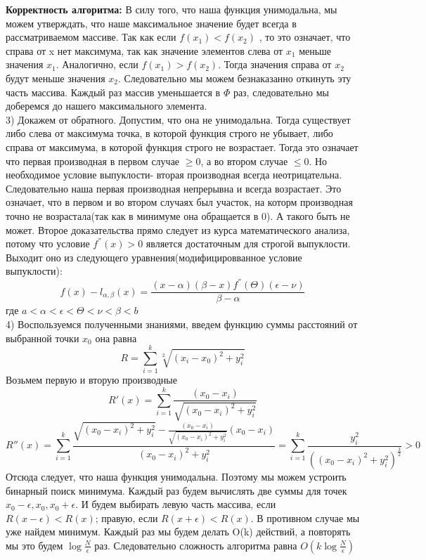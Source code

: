 \documentclass[a4paper,12pt]{article}
\begin{document}
\textbf{Корректность алгоритма:} В силу того, что наша функция унимодальна, мы можем утверждать, что наше максимальное значение будет всегда в рассматриваемом массиве. Так как если $f(x_1)<f(x_2)$ , то это означает, что справа от x нет максимума, так как значение элементов слева от $x_1$ меньше значения $x_1$. Аналогично, если $f(x_1)>f(x_2)$. Тогда значения справа от $x_2$ будут меньше значения $x_2$. Следовательно мы можем безнаказанно откинуть эту часть массива. Каждый раз массив уменьшается в $\Phi$ раз, следовательно мы доберемся до нашего максимального элемента.\\
3) Докажем от обратного. Допустим, что она не унимодальна. Тогда существует либо слева от максимума точка, в которой функция строго не убывает, либо справа от максимума, в которой функция строго не возрастает. Тогда это означает что первая производная в первом случае $\geq 0$, а во втором случае $\leq 0$. Но необходимое условие выпуклости- вторая производная всегда  неотрицательна. Следовательно наша первая производная непрерывна и всегда возрастает. Это означает, что в первом и во втором случаях был участок, на которм производная точно не возрастала(так как в минимуме она обращается в 0). А такого быть не может. Второе доказательства прямо следует из курса математического анализа, потому что условие $f^{''}(x)>0$ является достаточным для строгой выпуклости. Выходит оно из следующего уравнения(модифицировванное условие выпуклости):
\[f(x)-l_{\alpha,\beta}(x)=\frac{(x-\alpha)(\beta-x)f^{''}(\Theta)(\epsilon-\nu)}{\beta-\alpha}\] где $a<\alpha<\epsilon<\Theta<\nu<\beta<b$\\
4) Воспользуемся полученными знаниями, введем функцию суммы расстояний от выбранной точки $x_0$ она равна
\[R=\sum_{i=1}^k \sqrt[2]{(x_i-x_0)^2+y_i^2}\]
Возьмем первую и вторую производные
\[ R'(x) = \sum_{i=1}^k\frac{(x_0-x_i)}{\sqrt{(x_0-x_i)^2+y_i^2}} \]
\[ R''(x) = \sum_{i=1}^k\frac{\sqrt{(x_0-x_i)^2+y_i^2} - \frac{(x_0-x_i)}{\sqrt{(x_0-x_i)^2+y_i^2}}(x_0-x_i)}{(x_0-x_i)^2+y_i^2} = \sum_{i=1}^k \frac{y_i^2}{((x_0-x_i)^2+y_i^2)^{\frac{3}{2}}} > 0\]
Отсюда следует, что наша функция унимодальна. Поэтому мы можем устроить бинарный поиск минимума. Каждый раз будем вычислять две суммы для точек $x_0-\epsilon,x_0,x_0+\epsilon$. И будем выбирать левую часть массива, если $R(x-\epsilon)<R(x)$; правую, если $R(x+\epsilon)<R(x)$. В противном случае мы уже найдем минимум. Каждый раз мы будем делать O(k) действий, а повторять мы это будем $\log\frac{N}{\epsilon}$ раз. Следовательно сложность алгоритма равна $O(k \log \frac{N}{\epsilon})$\\
\end{document}
